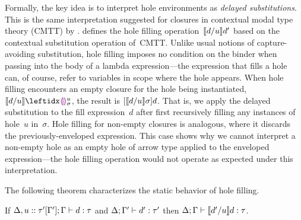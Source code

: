 Formally,
%
the key idea is to interpret hole environments as \emph{delayed substitutions}. This is the same interpretation suggested for closures in contextual modal
type theory (CMTT) by \citet{Nanevski2008}.
%
%
 defines the hole filling operation~$\llbracket d / u\rrbracket d'$
based on the contextual substitution operation of~CMTT.
%
Unlike usual notions of capture-avoiding substitution,
hole filling imposes no condition on the binder when passing into the
body of a lambda expression---the expression that fills a hole can, of
course, refer to variables in scope where the hole appears.
%
When hole filling encounters an empty closure for the hole being
instantiated, $\instantiate{d}{u}{\dehole{u}{\sigma}{}}$, the result
is $[\llbracket d / u\rrbracket \sigma]d$.
%
That is, we apply the delayed substitution to the fill expression~$d$
after first recursively filling any instances of hole~$u$ in~$\sigma$.
%
Hole filling for non-empty closures is analogous, where it discards
the previously-enveloped expression.
%
%
%
This case shows why we cannot interpret a non-empty hole as an empty
hole of arrow type applied to the enveloped expression---the hole
filling operation would not operate as expected under this
interpretation.




The following theorem characterizes the static behavior of hole filling.
\begin{thm}[Filling]
  If $\Delta, u :: \tau'[\Gamma']; \Gamma \vdash d : \tau$
  and $\Delta; \Gamma' \vdash d' : \tau'$
  then $\Delta; \Gamma \vdash \llbracket d' / u\rrbracket d : \tau$.
\end{thm}

